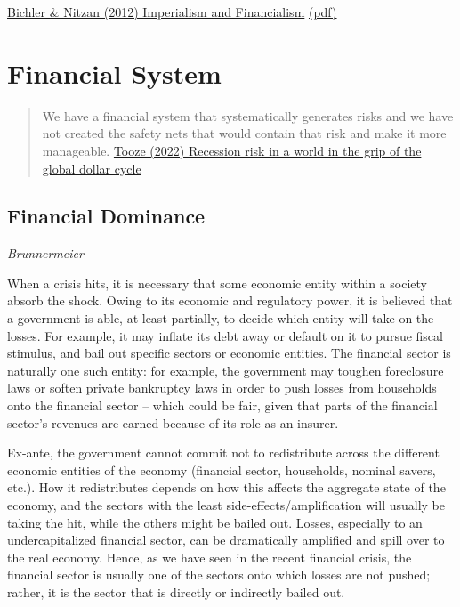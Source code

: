 \documentclass[
]{book}
\begin{document}
\href{http://bnarchives.yorku.ca/329/}{Bichler \& Nitzan (2012) Imperialism and Financialism}
\href{pdf/Bichler_Nitzan_2012_Imperialism_and_Financialism.pdf}{(pdf)}

\hypertarget{financial-system}{%
\chapter{Financial System}\label{financial-system}}

\begin{quote}
We have a financial system that systematically generates risks and we have not created the safety nets that would contain that risk and make it more manageable.
\href{https://adamtooze.substack.com/p/chartbook-158-recession-risk-in-a}{Tooze (2022) Recession risk in a world in the grip of the global dollar cycle}
\end{quote}

\hypertarget{financial-dominance}{%
\section{Financial Dominance}\label{financial-dominance}}

\emph{Brunnermeier}

When a crisis hits, it is necessary that some economic entity
within a society absorb the shock. Owing to its economic and
regulatory power, it is believed that a government is able, at
least partially, to decide which entity will take on the losses. For
example, it may inflate its debt away or default on it to pursue
fiscal stimulus, and bail out specific sectors or economic entities.
The financial sector is naturally one such entity: for example,
the government may toughen foreclosure laws or soften private
bankruptcy laws in order to push losses from households onto
the financial sector -- which could be fair, given that parts of
the financial sector's revenues are earned because of its role as
an insurer.

Ex-ante, the government cannot commit not to
redistribute across the different economic entities of the
economy (financial sector, households, nominal savers,
etc.). How it redistributes depends on how this affects the
aggregate state of the economy, and the sectors with the
least side-effects/amplification will usually be taking the
hit, while the others might be bailed out. Losses, especially
to an undercapitalized financial sector, can be dramatically
amplified and spill over to the real economy. Hence, as we
have seen in the recent financial crisis, the financial sector is
usually one of the sectors onto which losses are not pushed;
rather, it is the sector that is directly or indirectly bailed out.
\end{document}
